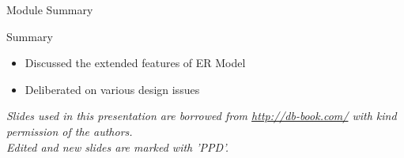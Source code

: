 \documentclass[aspectratio=169, xcolor=dvipsnames]{beamer}
\begin{document}
\begin{frame}{Module Summary}
    \begin{block}{Summary}
        \begin{itemize}[<+->]
            \item Discussed the extended features of ER Model
            \item Deliberated on various design issues
        \end{itemize}
    \end{block}
    \vspace{2em}
    \begin{center}
    \small \textit{Slides used in this presentation are borrowed from \url{http://db-book.com/} with kind permission of the authors.} \\
    \small \textit{Edited and new slides are marked with 'PPD'.}
    \end{center}
\end{frame}
\end{document}
